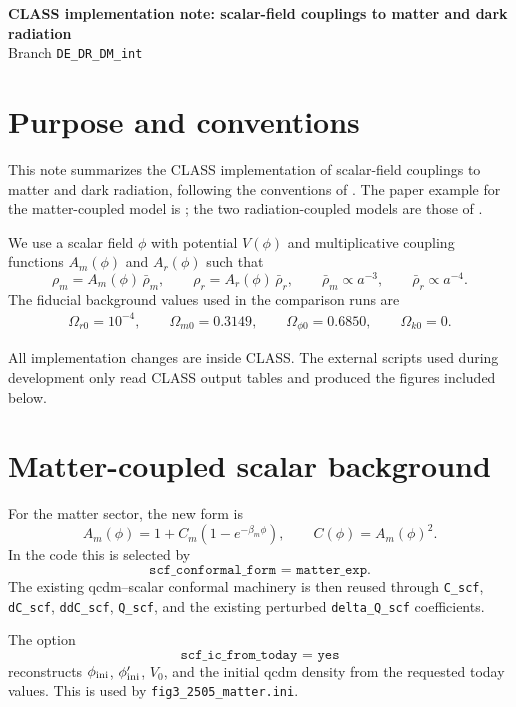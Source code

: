 \documentclass[11pt,a4paper,english,twoside]{article}
\def\beq{\begin{equation}}
\def\eeq{\end{equation}}
\def\bea{\begin{eqnarray}}
\def\eea{\end{eqnarray}}
\def\Am{A_m}
\def\Ar{A_r}
\def\rhob{\bar\rho}
\begin{document}

\begin{center}
{\Large \bf CLASS implementation note: scalar-field couplings to matter and dark radiation}\\[5pt]
{\normalsize Branch \texttt{DE\_DR\_DM\_int}}
\end{center}

\section{Purpose and conventions}

This note summarizes the CLASS implementation of scalar-field couplings to matter and
dark radiation, following the conventions of
.  The paper example for
the matter-coupled model is ; the two radiation-coupled
models are those of .

We use a scalar field $\phi$ with potential $V(\phi)$ and multiplicative coupling
functions $\Am(\phi)$ and $\Ar(\phi)$ such that
\beq
\rho_m = \Am(\phi)\,\rhob_m,\qquad
\rho_r = \Ar(\phi)\,\rhob_r,\qquad
\rhob_m\propto a^{-3},\qquad \rhob_r\propto a^{-4}.
\label{eq:bgdensities}
\eeq
The fiducial background values used in the comparison runs are
\bea
\Omega_{r0}=10^{-4},\qquad
\Omega_{m0}=0.3149,\qquad
\Omega_{\phi0}=0.6850,\qquad
\Omega_{k0}=0.
\eea

All implementation changes are inside CLASS.  The external scripts used during
development only read CLASS output tables and produced the figures included below.

\section{Matter-coupled scalar background}

For the matter sector, the new form is
\beq
\Am(\phi)=1+C_m\left(1-e^{-\beta_m\phi}\right),\qquad
C(\phi)=\Am(\phi)^2.
\label{eq:amform}
\eeq
In the code this is selected by
\beq
\texttt{scf\_conformal\_form = matter\_exp}.
\eeq
The existing qcdm--scalar conformal machinery is then reused through
\texttt{C\_scf}, \texttt{dC\_scf}, \texttt{ddC\_scf}, \texttt{Q\_scf}, and the
existing perturbed \texttt{delta\_Q\_scf} coefficients.

The option
\beq
\texttt{scf\_ic\_from\_today = yes}
\eeq
reconstructs $\phi_{\rm ini}$, $\phi'_{\rm ini}$, $V_0$, and the initial qcdm
density from the requested today values.  This is used by
\texttt{fig3\_2505\_matter.ini}.
\end{document}
